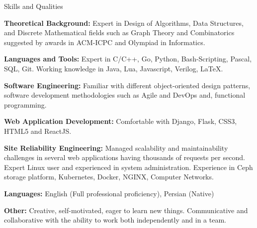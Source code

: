 \documentclass{resume} %
\begin{document}
\begin{rSection}{Skills and Qualities}

	{\bf Theoretical Background:}
	Expert in Design of Algorithms, Data Structures, and Discrete Mathematical fields such as Graph Theory and Combinatorics suggested by awards in ACM-ICPC and Olympiad in Informatics.

	{\bf Languages and Tools:}
	Expert in C/C++, Go, Python, Bash-Scripting, Pascal, SQL, Git. Working knowledge in Java, Lua, Javascript, Verilog, \LaTeX.

	{\bf Software Engineering:}
	Familiar with different object-oriented design patterns, software development methodologies such as Agile and DevOps and, functional programming.

	{\bf Web Application Development:}
	Comfortable with Django, Flask, CSS3, HTML5 and ReactJS.

	{\bf Site Reliability Engineering:}
	Managed scalability and maintainability challenges in several web applications having thousands of requests per second.
	Expert Linux user and experienced in system administration.
	Experience in Ceph storage platform, Kubernetes, Docker, NGINX, Computer Networks.

	{\bf Languages:}
	English (Full professional proficiency), Persian (Native)

	{\bf Other:}
	Creative, self-motivated, eager to learn new things. Communicative and collaborative with the ability to work both independently and in a team.

\end{rSection}
	
\end{document}
